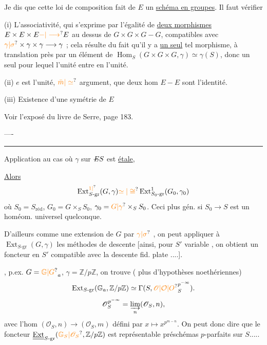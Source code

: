 Je dis que cette loi de composition fait de $E$ un \uline{schéma en groupes}. Il faut vérifier

(i) L'associativité, qui s'exprime par l'égalité de \uline{deux morphismes} $E\times E\times E\unsure{-|\longrightarrow}E$ au dessus de $G\times G\times G-G$, compatibles avec $\unsure{\gamma|\sigma}\times\gamma\times\gamma\longrightarrow\gamma$ ; cela résulte du fait qu'il y a \uline{un seul} tel morphisme, à translation près par un élément de $\operatorname{Hom}_S(G\times G\times G,\gamma)\simeq\gamma(S)$, donc un seul pour lequel l'unité entre en l'unité.

(ii) $e$ est l'unité, $\unsure{\bar m|\simeq}$ argument,   que deux hom $E-E$ sont l'identité.

(iii) Existence d'une symétrie de $E$

Voir l'exposé du livre de Serre, page 183.

\noindent ----

\noindent\rule{.72\linewidth}{.3pt}

Application au cas où $\gamma$ sur $\deleted{E}S$ est \uline{étale}, 

\uline{Alors}
\[
\operatorname{Ext}^{\unsure{1|{}}}_{S\text{-gr}}(G,\gamma)\unsure{\simeq|\cong}\operatorname{Ext}^{1}_{S_0\text{-gr}}(G_0,\gamma_0)
\]
où $S_0=S_{\mathrm{réd}}$, $G_0=G\times_S S_0$, $\gamma_0=\unsure{G|\gamma}\times_S S_0$. Ceci  plus gén. si $S_0\longrightarrow S$ est un homéom. universel quelconque. 



D'ailleurs  comme une extension de $G$ par $\unsure{\gamma|\sigma}$ , on peut appliquer à $\operatorname{Ext}_{S\text{-gr}}(G,\gamma)$ les méthodes de descente [ainsi, pour $S'$ variable , on obtient un foncteur en $S'$ compatible avec la descente fid. plate ....].

, p.ex. $G={\unsure{\mathbb G|G}}_a$, $\gamma=\mathbb{Z}/p\mathbb{Z}$, on trouve (   plus d'hypothèses noethériennes)
\[
\operatorname{Ext}_{S\text{-gr}}(\mathbb{G}_a,\mathbb{Z}/p\mathbb{Z})\simeq\Gamma(S,{\unsure{\mathscr O|\mathcal O|O}}_S^{p^{-\infty}}).
\]
\[
\mathscr{O}_S^{p^{-\infty}}=\varinjlim_n(\mathscr{O}_S,n),
\]
avec l'hom $(\mathscr{O}_S,n)\longrightarrow(\mathscr{O}_S,m)$ défini par $x\longmapsto x^{p^{m-n}}$. On peut donc dire que le foncteur $\underline{\underline{\operatorname{Ext}}}_{S\text{-gr}}(\unsure{\mathbb{G}_S|\mathscr{O}_S},\mathbb{Z}/p\mathbb{Z})$ est représentable   préschémas $p$-parfaits sur $S$.....

